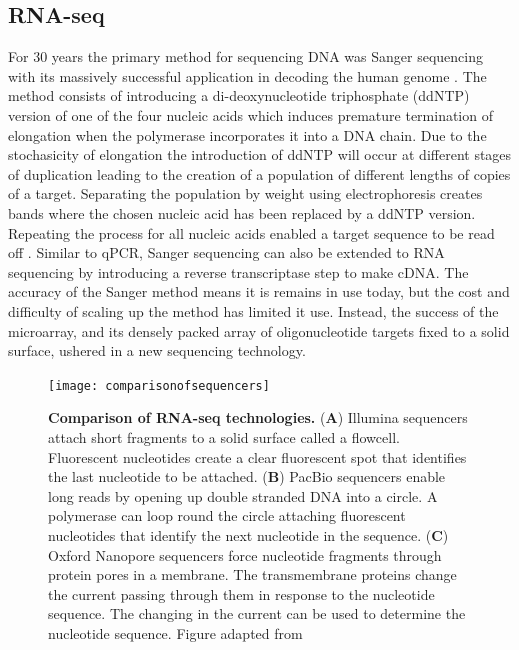 \documentclass[../main.tex]{subfiles}
\begin{document}
\subsection{RNA-seq}

For 30 years the primary method for sequencing DNA was Sanger sequencing with its massively successful application in decoding the human genome \parencite{Lander2001}. 
The method consists of introducing a di-deoxynucleotide triphosphate (ddNTP) version of one of the four nucleic acids which induces premature termination of elongation when the polymerase incorporates it into a DNA chain.
Due to the stochasicity of elongation the introduction of ddNTP will occur at different stages of duplication leading to the creation of a population of different lengths of copies of a target.
Separating the population by weight using electrophoresis creates bands where the chosen nucleic acid has been replaced by a ddNTP version.
Repeating the process for all nucleic acids enabled a target sequence to be read off \parencite{Sanger1977}.
Similar to qPCR, Sanger sequencing can also be extended to RNA sequencing by introducing a reverse transcriptase step to make cDNA.
The accuracy of the Sanger method means it is remains in use today, but the cost and difficulty of scaling up the method has limited it use.
Instead, the success of the microarray, and its densely packed array of oligonucleotide targets fixed to a solid surface, ushered in a new sequencing technology.

\begin{figure}[h]

{\centering \texttt{[image: comparisonofsequencers]} 

}

\caption[Comparison of RNA-seq technologies.]{\textbf{Comparison of RNA-seq technologies.} (\textbf{A}) Illumina sequencers attach short fragments to a solid surface called a flowcell. Fluorescent nucleotides create a clear fluorescent spot that identifies the last nucleotide to be attached. (\textbf{B}) PacBio sequencers enable long reads by opening up double stranded DNA into a circle. A polymerase can loop round the circle attaching fluorescent nucleotides that identify the next nucleotide in the sequence. (\textbf{C}) Oxford Nanopore sequencers force nucleotide fragments through protein pores in a membrane. The transmembrane proteins change the current passing through them in response to the nucleotide sequence. The changing in the current can be used to determine the nucleotide sequence. Figure adapted from \cite{Stark2019}}\label{fig:rna-seq-tech}
\end{figure}
\end{document}
